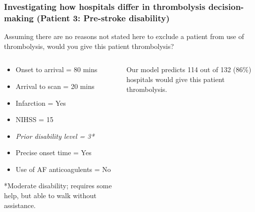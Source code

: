 \documentclass{beamer}
\begin{document}
\begin{frame}
\frametitle{Investigating how hospitals differ in thrombolysis decision-making (Patient 3: Pre-stroke disability)}

Assuming there are no reasons not stated here to exclude a patient from use of thrombolysis, would you give this patient thrombolysis?

\vspace{3mm}

\begin{columns}
    \begin{column}{0.5\textwidth}
        \begin{itemize}
            \item Onset to arrival = 80 mins
            \item Arrival to scan = 20 mins
            \item Infarction = Yes
            \item NIHSS = 15
            \item \emph{Prior disability level = 3*}
            \item Precise onset time = Yes
            \item Use of AF anticoagulents = No
        \end{itemize}
    \vspace{3mm}    
    \footnotesize{*Moderate disability; requires some help, but able to walk without assistance.}
    \end{column}
    
    \begin{column}{0.4\textwidth}
    Our model predicts 114 out of 132 (86\%) hospitals would give this patient thrombolysis.
    \end{column}

\end{columns}
\end{frame}

\end{document}
